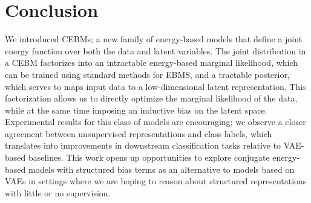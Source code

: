 \documentclass{article}
\begin{document}
\section{Conclusion}
\label{sec:conclusion}


We introduced CEBMs; a new family of energy-based models that define a joint energy function over both the data and latent variables. The joint distribution in a CEBM factorizes into an intractable energy-based marginal likelihood, which can be trained using standard methods for EBMS, and a tractable posterior, which serves to maps input data to a low-dimensional latent representation. This factorization allows us to directly optimize the marginal likelihood of the data, while at the same time imposing an inductive bias on the latent space. Experimental results for this class of models are encouraging; we observe a closer agreement between unsupervised representations and class labels, which translates into improvements in downstream classification tasks relative to VAE-based baselines. This work opens up opportunities to explore conjugate energy-based models with structured bias terms as an alternative to models based on VAEs in settings where we are hoping to reason about structured representations with little or no supervision. 


\end{document}
